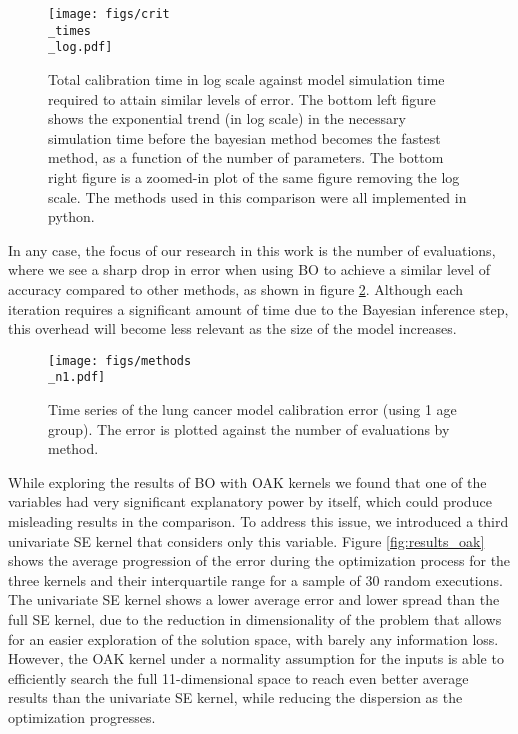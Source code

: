 \documentclass{IOS-Book-Article}
\begin{document}
	\begin{figure}[h!]
		\centering	
		\texttt{[image: figs/crit\\\_times\\\_log.pdf]}		
		\caption{Total calibration time in log scale against model simulation time required to attain similar levels of error. The bottom left figure shows the exponential trend (in log scale) in the necessary simulation time before the bayesian method becomes the fastest method, as a function of the number of parameters. The bottom right figure is a zoomed-in plot of the same figure removing the log scale. The methods used in this comparison were all implemented in python.}
		\label{fig:sim_times}	
	\end{figure}
	
	In any case, the focus of our research in this work is the number of evaluations, where we see a sharp drop in error when using BO to achieve a similar level of accuracy compared to other methods, as shown in figure \ref{fig:method_comparison}. Although each iteration requires a significant amount of time due to the Bayesian inference step, this overhead will become less relevant as the size of the model increases.
	
	\begin{figure}[h!]
		\centering	
		\texttt{[image: figs/methods\\\_n1.pdf]}		
		\caption{Time series of the lung cancer model calibration error (using 1 age group). The error is plotted against the number of evaluations by method.}
		\label{fig:method_comparison}	
	\end{figure}
	
	While exploring the results of BO with OAK kernels we found that one of the variables had very significant explanatory power by itself, which could produce misleading results in the comparison. To address this issue, we introduced a third univariate SE kernel that considers only this variable. Figure \ref{fig:results_oak} shows the average progression of the error during the optimization process for the three kernels and their interquartile range for a sample of 30 random executions. The univariate SE kernel shows a lower average error and lower spread than the full SE kernel, due to the reduction in dimensionality of the problem that allows for an easier exploration of the solution space, with barely any information loss. However, the OAK kernel under a normality assumption for the inputs is able to efficiently search the full 11-dimensional space to reach even better average results than the univariate SE kernel, while reducing the dispersion as the optimization progresses.
	
\end{document}
